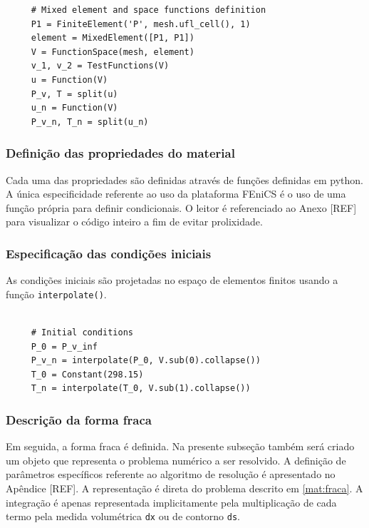      \begin{verbatim}
     # Mixed element and space functions definition
     P1 = FiniteElement('P', mesh.ufl_cell(), 1)
     element = MixedElement([P1, P1])
     V = FunctionSpace(mesh, element)
     v_1, v_2 = TestFunctions(V)
     u = Function(V)
     P_v, T = split(u)
     u_n = Function(V)
     P_v_n, T_n = split(u_n)

    \end{verbatim} 
   
    \subsubsection{Definição das propriedades do material}
    Cada uma das propriedades são definidas através de funções definidas em
    python. A única especificidade referente ao uso da plataforma FEniCS é o uso
    de uma função própria para definir condicionais. O leitor é referenciado ao
    Anexo [REF] para visualizar o código inteiro a fim de evitar prolixidade. 

    \subsubsection{Especificação das condições iniciais}
    As condições iniciais são projetadas no espaço de elementos finitos usando a
    função \texttt{interpolate()}.
    
    \begin{verbatim}
     
     # Initial conditions
     P_0 = P_v_inf
     P_v_n = interpolate(P_0, V.sub(0).collapse())
     T_0 = Constant(298.15)
     T_n = interpolate(T_0, V.sub(1).collapse())
    \end{verbatim} 

    \subsubsection{Descrição da forma fraca}
    Em seguida, a forma fraca é definida. Na presente subseção também será
    criado um objeto que representa o problema numérico a ser resolvido. A
    definição de parâmetros específicos referente ao algoritmo de resolução é
    apresentado no Apêndice [REF]. A representação é direta do problema descrito
    em \ref{mat:fraca}. A integração é apenas representada implicitamente pela
    multiplicação de cada termo pela medida volumétrica
    \texttt{dx} ou de contorno
    \texttt{ds}.

